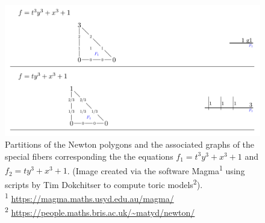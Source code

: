 \begin{example}
\begin{figure} \label{computation}
\includegraphics[width=\textwidth]{examples}
\caption[Caption for example]{Partitions of the Newton polygons and the associated graphs of the special fibers corresponding the the equations $f_1 = t^3 y^3 + x^3 + 1$ and $f_2 = t y^3 + x^3 + 1$. (Image created via the software Magma\textsuperscript{1} using scripts by Tim Dokchitser to compute toric models\textsuperscript{2}).
\\
\small\textsuperscript{1} \url{https://magma.maths.usyd.edu.au/magma/}
\\
\small\textsuperscript{2} \url{https://people.maths.bris.ac.uk/~matyd/newton/}}
\end{figure}
\end{example}

